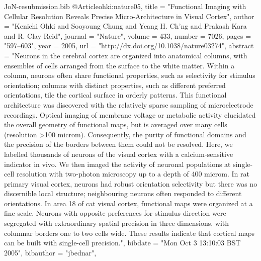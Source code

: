 \documentclass{article}
\begin{document}
\begin{filecontents}{JoN-resubmission.bib}
@Article{ohki:nature05,
  title	       = "Functional Imaging with Cellular Resolution Reveals
                  Precise Micro-Architecture in Visual Cortex",
  author       = "Kenichi Ohki and Sooyoung Chung and Yeang H. Ch'ng
                  and Prakash Kara and R. Clay Reid",
  journal      = "Nature",
  volume       = 433,
  number       = 7026,
  pages	       = "597--603",
  year	       = 2005,
  url	       = "http://dx.doi.org/10.1038/nature03274",
  abstract     = "Neurons in the cerebral cortex are organized into
                  anatomical columns, with ensembles of cells arranged
                  from the surface to the white matter. Within a
                  column, neurons often share functional properties,
                  such as selectivity for stimulus orientation;
                  columns with distinct properties, such as different
                  preferred orientations, tile the cortical surface in
                  orderly patterns. This functional architecture was
                  discovered with the relatively sparse sampling of
                  microelectrode recordings. Optical imaging of
                  membrane voltage or metabolic activity elucidated
                  the overall geometry of functional maps, but is
                  averaged over many cells (resolution >100
                  microm). Consequently, the purity of functional
                  domains and the precision of the borders between
                  them could not be resolved. Here, we labelled
                  thousands of neurons of the visual cortex with a
                  calcium-sensitive indicator in vivo. We then imaged
                  the activity of neuronal populations at single-cell
                  resolution with two-photon microscopy up to a depth
                  of 400 microm. In rat primary visual cortex, neurons
                  had robust orientation selectivity but there was no
                  discernible local structure; neighbouring neurons
                  often responded to different orientations. In area
                  18 of cat visual cortex, functional maps were
                  organized at a fine scale. Neurons with opposite
                  preferences for stimulus direction were segregated
                  with extraordinary spatial precision in three
                  dimensions, with columnar borders one to two cells
                  wide. These results indicate that cortical maps can
                  be built with single-cell precision.",
  bibdate      = "Mon Oct 3 13:10:03 BST 2005",
  bibauthor    = "jbednar",
}


\end{filecontents}
\end{document}
